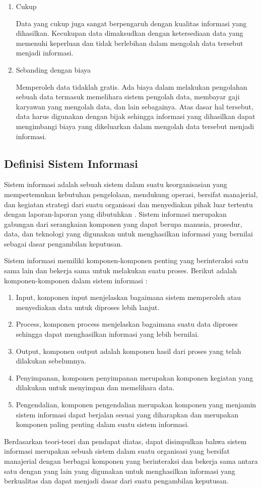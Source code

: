 \begin{enumerate}
	\item Cukup

	Data yang cukup juga sangat berpengaruh dengan kualitas informasi yang dihasilkan. Kecukupan data dimaksudkan dengan ketersediaan data yang memenuhi keperluan dan tidak berlebihan dalam mengolah data tersebut menjadi informasi.

	\item Sebanding dengan biaya

	Memperoleh data tidaklah gratis. Ada biaya dalam melakukan pengolahan sebuah data termasuk memelihara sistem pengolah data, membayar gaji karyawan yang mengolah data, dan lain sebagainya. Atas dasar hal tersebut, data harus digunakan dengan bijak sehingga informasi yang dihasilkan dapat mengimbangi biaya yang dikeluarkan dalam mengolah data tersebut menjadi informasi.
\end{enumerate}

\subsection{Definisi Sistem Informasi}
	Sistem informasi adalah sebuah sistem dalam suatu keorganisasian yang mempertemukan kebutuhan pengelolaan, mendukung operasi, bersifat manajerial, dan kegiatan strategi dari suatu organisasi dan menyediakan pihak luar tertentu dengan laporan-laporan yang dibutuhkan \citep{Hutahaean2015}. Sistem informasi merupakan gabungan dari serangkaian komponen yang dapat berupa manusia, prosedur, data, dan teknologi yang digunakan untuk menghasilkan informasi yang bernilai sebagai dasar pengambilan keputusan.

	Sistem informasi memiliki komponen-komponen penting yang berinteraksi satu sama lain dan bekerja sama untuk melakukan suatu proses. Berikut adalah komponen-komponen dalam sistem informasi \citep{Jogiyanto2005}:

\begin{enumerate}

	\item Input, komponen input menjelaskan bagaimana sistem memperoleh atau menyediakan data untuk diproses lebih lanjut.
	\item Process, komponen process menjelaskan bagaimana suatu data diproses sehingga dapat menghasilkan informasi yang lebih bernilai.
	\item Output, komponen output adalah komponen hasil dari proses yang telah dilakukan sebelumnya.
	\item Penyimpanan, komponen penyimpanan merupakan komponen kegiatan yang dilakukan untuk menyimpan dan memelihara data.
	\item Pengendalian, komponen pengendalian merupakan komponen yang menjamin sistem informasi dapat berjalan sesuai yang diharapkan dan merupakan komponen paling penting dalam suatu sistem informasi.
\end{enumerate}
	Berdasarkan teori-teori dan pendapat diatas, dapat disimpulkan bahwa sistem informasi merupakan sebuah sistem dalam suatu organisasi yang bersifat manajerial dengan berbagai komponen yang berinteraksi dan bekerja sama antara satu dengan yang lain yang digunakan untuk menghasilkan informasi yang berkualitas dan dapat menjadi dasar dari suatu pengambilan keputusan.

